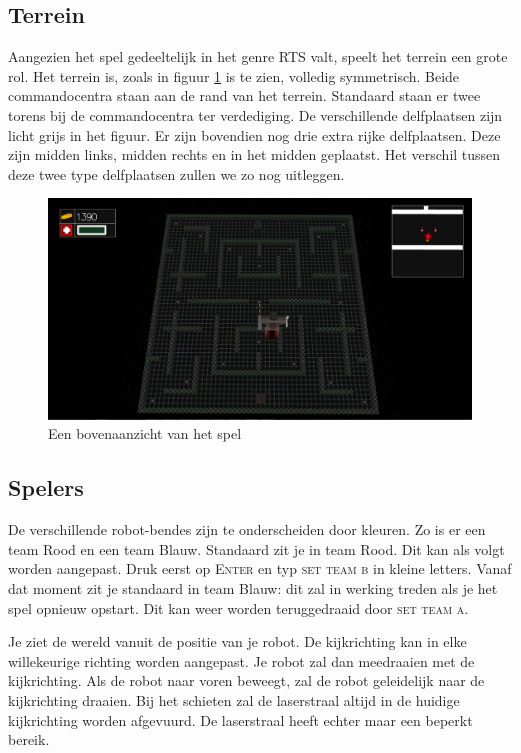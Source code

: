 	\subsection{Terrein}
    Aangezien het spel gedeeltelijk in het genre RTS valt, speelt het terrein een grote rol. Het terrein is, zoals in figuur \ref{fig:terrein} is te zien, volledig symmetrisch. Beide commandocentra staan aan de rand van het terrein. Standaard staan er twee torens bij de commandocentra ter verdediging. De verschillende delfplaatsen zijn licht grijs in het figuur. Er zijn bovendien nog drie extra rijke delfplaatsen. Deze zijn midden links, midden rechts en in het midden geplaatst. Het verschil tussen deze twee type delfplaatsen zullen we zo nog uitleggen.

    \begin{figure}[h]
        \centering
    	\includegraphics[width=\textwidth]{kaart.png}
	\caption{Een bovenaanzicht van het spel}
    \label{fig:terrein}
    \end{figure}

    \subsection{Spelers}
    De verschillende robot-bendes zijn te onderscheiden door kleuren. Zo is er een team Rood en een team Blauw. Standaard zit je in team Rood. Dit kan als volgt worden aangepast. Druk eerst op \textsc{Enter} en typ \textsc{set team b} in kleine letters. Vanaf dat moment zit je standaard in team Blauw: dit zal in werking treden als je het spel opnieuw opstart. Dit kan weer worden teruggedraaid door \textsc{set team a}.

    Je ziet de wereld vanuit de positie van je robot. De kijkrichting kan in elke willekeurige richting worden aangepast. Je robot zal dan meedraaien met de kijkrichting. Als de robot naar voren beweegt, zal de robot geleidelijk naar de kijkrichting draaien. Bij het schieten zal de laserstraal altijd in de huidige kijkrichting worden afgevuurd. De laserstraal heeft echter maar een beperkt bereik.

